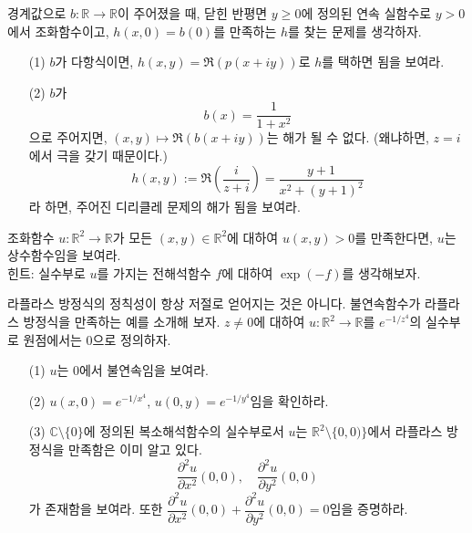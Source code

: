 \begin{salt_exercise}  \label{ex-5-8}
경계값으로  $b:\mathbb R \to \mathbb R$이 주어졌을 때,
닫힌 반평면 $y\ge0$에 정의된 연속 실함수로
$y>0$에서 조화함수이고, $h(x,0)=b(0)$를 만족하는 
$h$를 찾는 문제를 생각하자.
\begin{itemize}
\item[(1)] $b$가 다항식이면, $h(x,y) = \Re(p(x+iy))$로  $h$를 택하면 됨을 보여라.
\item[(2)] $b$가
\[
b(x) = \dfrac1{1+x^2}
\]
으로 주어지면, $(x,y) \mapsto \Re(b(x+iy))$는 해가 될 수 없다.
(왜냐하면, $z=i$에서 극을 갖기 때문이다.)
\[
h(x,y):= \Re\left(\dfrac{i}{z+i}\right) 
= \dfrac{y+1}{x^2+(y+1)^2}
\]
라 하면, 주어진 디리클레 문제의 해가 됨을 보여라.
\end{itemize}
\end{salt_exercise}

\begin{salt_exercise}\label{ex-5-9}
조화함수 $u:\mathbb R^2\to \mathbb R$가 모든 $(x,y)\in\mathbb R^2$에 대하여
$u(x,y)>0$를 만족한다면, $u$는 상수함수임을 보여라. \\
힌트: 실수부로 $u$를 가지는 전해석함수 $f$에 대하여  $\exp(-f)$를 생각해보자.
\end{salt_exercise}

\begin{salt_exercise}\label{ex-5-10}
라플라스 방정식의 정칙성이 항상 저절로 얻어지는 것은 아니다.
불연속함수가 라플라스 방정식을 만족하는 예를 소개해 보자.
$z\ne 0$에 대하여
$u:\mathbb R^2\to \mathbb R$를 $e^{-1/z^4}$의 실수부로 
원점에서는 $0$으로 정의하자.
\begin{itemize}
\item[(1)] $u$는 $0$에서 불연속임을 보여라.
\item[(2)] $u(x,0) = e^{-1/x^4}$, $u(0,y) = e^{-1/y^4}$임을 확인하라.
\item[(3)] $\mathbb C\setminus\{0\}$에 정의된 복소해석함수의 실수부로서
$u$는 $\mathbb R^2\setminus\{0,0)\}$에서 라플라스 방정식을 만족함은 이미 알고 있다.
\[
\dfrac{\partial^2 u}{\partial x^2}(0,0), \quad
\dfrac{\partial^2 u}{\partial y^2}(0,0)
\]
가 존재함을 보여라.
또한 $\dfrac{\partial^2 u}{\partial x^2}(0,0) + \dfrac{\partial^2 u}{\partial y^2}(0,0) =0$임을
증명하라.
\end{itemize}
\end{salt_exercise}

